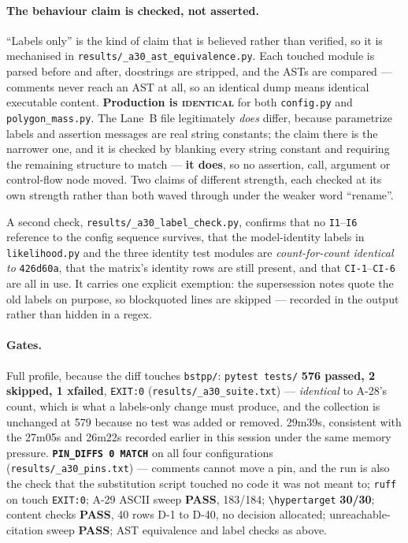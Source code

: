 \documentclass[
  10pt,
]{article}
\begin{document}
\paragraph{The behaviour claim is checked, not asserted.}
``Labels only'' is the kind of claim that is believed rather than verified, so it is mechanised in \texttt{results/\allowbreak{}\_a30\_ast\_equivalence.py}. Each touched module is parsed before and after, docstrings are stripped, and the ASTs are compared --- comments never reach an AST at all, so an identical dump means identical executable content. \textbf{Production is \textsc{identical}} for both \texttt{config.py} and \texttt{polygon\_mass.py}. The Lane~B file legitimately \emph{does} differ, because parametrize labels and assertion messages are real string constants; the claim there is the narrower one, and it is checked by blanking every string constant and requiring the remaining structure to match --- \textbf{it does}, so no assertion, call, argument or control-flow node moved. Two claims of different strength, each checked at its own strength rather than both waved through under the weaker word ``rename''.

A second check, \texttt{results/\allowbreak{}\_a30\_label\_check.py}, confirms that no \texttt{I1}--\texttt{I6} reference to the config sequence survives, that the model-identity labels in \texttt{likelihood.py} and the three identity test modules are \emph{count-for-count identical to} \texttt{426d60a}, that the matrix's identity rows are still present, and that \texttt{CI-1}--\texttt{CI-6} are all in use. It carries one explicit exemption: the supersession notes quote the old labels on purpose, so blockquoted lines are skipped --- recorded in the output rather than hidden in a regex.

\paragraph{Gates.}
Full profile, because the diff touches \texttt{bstpp/}: \texttt{pytest tests/} \textbf{576 passed, 2 skipped, 1 xfailed}, \texttt{EXIT:0} (\texttt{results/\allowbreak{}\_a30\_suite.txt}) --- \emph{identical} to A-28's count, which is what a labels-only change must produce, and the collection is unchanged at 579 because no test was added or removed. 29m39s, consistent with the 27m05s and 26m22s recorded earlier in this session under the same memory pressure. \textbf{\texttt{PIN\_DIFFS 0 MATCH}} on all four configurations (\texttt{results/\allowbreak{}\_a30\_pins.txt}) --- comments cannot move a pin, and the run is also the check that the substitution script touched no code it was not meant to; \texttt{ruff} on touch \texttt{EXIT:0}; A-29 ASCII sweep \textbf{PASS}, 183/184; \texttt{\textbackslash hypertarget} \textbf{30/30}; content checks \textbf{PASS}, 40 rows D-1 to D-40, no decision allocated; unreachable-citation sweep \textbf{PASS}; AST equivalence and label checks as above.
\end{document}
